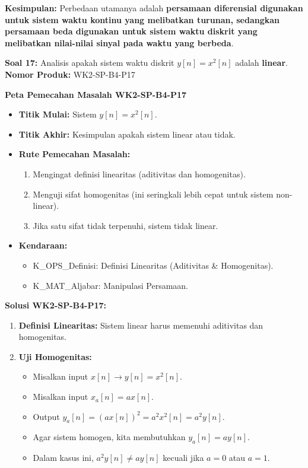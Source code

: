 \documentclass[
  letterpaper,
  DIV=11,
  numbers=noendperiod]{scrreprt}
\providecommand{\tightlist}{%
  \setlength{\itemsep}{0pt}\setlength{\parskip}{0pt}}
\begin{document}
\textbf{Kesimpulan:} Perbedaan utamanya adalah \textbf{persamaan
diferensial digunakan untuk sistem waktu kontinu yang melibatkan
turunan, sedangkan persamaan beda digunakan untuk sistem waktu diskrit
yang melibatkan nilai-nilai sinyal pada waktu yang berbeda}.

\textbf{Soal 17:} Analisis apakah sistem waktu diskrit \(y[n] = x^2[n]\)
adalah \textbf{linear}. \textbf{Nomor Produk:} WK2-SP-B4-P17

\textbf{Peta Pemecahan Masalah WK2-SP-B4-P17}

\begin{itemize}
\tightlist
\item
  \textbf{Titik Mulai:} Sistem \(y[n] = x^2[n]\).
\item
  \textbf{Titik Akhir:} Kesimpulan apakah sistem linear atau tidak.
\item
  \textbf{Rute Pemecahan Masalah:}

  \begin{enumerate}
  \def\labelenumi{\arabic{enumi}.}
  \tightlist
  \item
    Mengingat definisi linearitas (aditivitas dan homogenitas).
  \item
    Menguji sifat homogenitas (ini seringkali lebih cepat untuk sistem
    non-linear).
  \item
    Jika satu sifat tidak terpenuhi, sistem tidak linear.
  \end{enumerate}
\item
  \textbf{Kendaraan:}

  \begin{itemize}
  \tightlist
  \item
    K\_OPS\_Definisi: Definisi Linearitas (Aditivitas \& Homogenitas).
  \item
    K\_MAT\_Aljabar: Manipulasi Persamaan.
  \end{itemize}
\end{itemize}

\textbf{Solusi WK2-SP-B4-P17:}

\begin{enumerate}
\def\labelenumi{\arabic{enumi}.}
\tightlist
\item
  \textbf{Definisi Linearitas:} Sistem linear harus memenuhi aditivitas
  dan homogenitas.
\item
  \textbf{Uji Homogenitas:}

  \begin{itemize}
  \tightlist
  \item
    Misalkan input \(x[n] \rightarrow y[n] = x^2[n]\).
  \item
    Misalkan input \(x_a[n] = a x[n]\).
  \item
    Output \(y_a[n] = (a x[n])^2 = a^2 x^2[n] = a^2 y[n]\).
  \item
    Agar sistem homogen, kita membutuhkan \(y_a[n] = a y[n]\).
  \item
    Dalam kasus ini, \(a^2 y[n] \neq a y[n]\) kecuali jika \(a=0\) atau
    \(a=1\).
  \end{itemize}
\end{enumerate}
\end{document}
